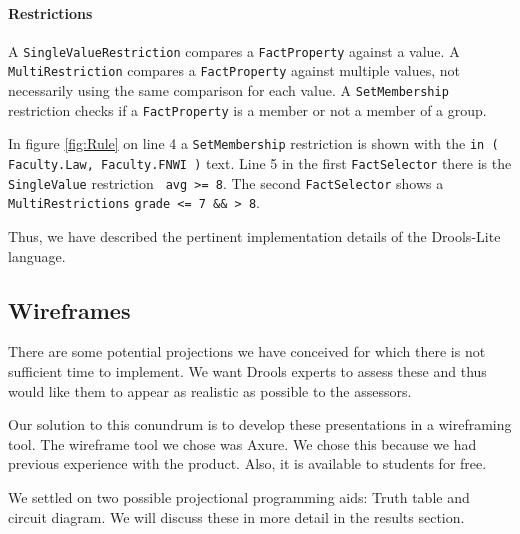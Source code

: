 \paragraph{Restrictions} A \texttt{SingleValueRestriction} compares a \texttt{FactProperty} against a value.
A \texttt{MultiRestriction} compares a \texttt{FactProperty} against multiple values, not necessarily using the same comparison for each value.
A \texttt{SetMembership} restriction checks if a \texttt{FactProperty} is a member or not a member of a group.

In figure \ref{fig:Rule} on line 4 a \texttt{SetMembership} restriction is shown with the \texttt{in ( Faculty.Law, Faculty.FNWI )} text.
Line 5 in the first \texttt{FactSelector} there is the \texttt{SingleValue} restriction \texttt{ avg >= 8}.
The second \texttt{FactSelector} shows a \texttt{MultiRestrictions} \texttt{grade <= 7 \&\& > 8}.

Thus, we have described the pertinent implementation details of the Drools-Lite language.

\subsection{Wireframes}

There are some potential projections we have conceived for which there is not sufficient time to implement.
We want Drools experts to assess these and thus would like them to appear as realistic as possible to the assessors.

Our solution to this conundrum is to develop these presentations in a wireframing tool.
The wireframe tool we chose was Axure\cite{Axure_ProductPage}.
We chose this because we had previous experience with the product.
Also, it is available to students for free.

We settled on two possible projectional programming aids: Truth table and circuit diagram.
We will discuss these in more detail in the results section.
